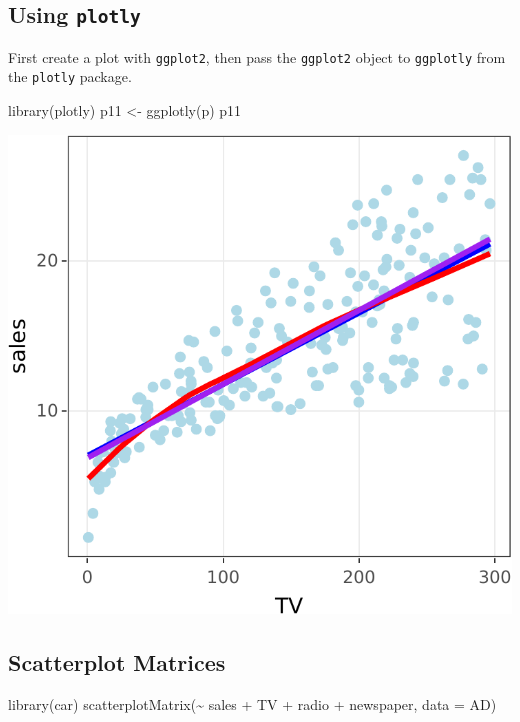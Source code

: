 \documentclass[
]{article}
\newenvironment{Shaded}{\begin{snugshade}}{\end{snugshade}}
\newcommand{\AttributeTok}[1]{\textcolor[rgb]{0.77,0.63,0.00}{#1}}
\newcommand{\FunctionTok}[1]{\textcolor[rgb]{0.00,0.00,0.00}{#1}}
\newcommand{\NormalTok}[1]{#1}
\newcommand{\OtherTok}[1]{\textcolor[rgb]{0.56,0.35,0.01}{#1}}
\newcommand{\SpecialCharTok}[1]{\textcolor[rgb]{0.00,0.00,0.00}{#1}}
\begin{document}
\hypertarget{using-plotly}{%
\subsection{\texorpdfstring{Using \texttt{plotly}}{Using plotly}}\label{using-plotly}}

First create a plot with \texttt{ggplot2}, then pass the \texttt{ggplot2} object to \texttt{ggplotly} from the \texttt{plotly} package.

\begin{Shaded}
\begin{Highlighting}[]
\FunctionTok{library}\NormalTok{(plotly)}
\NormalTok{p11 }\OtherTok{\textless{}{-}} \FunctionTok{ggplotly}\NormalTok{(p)}
\NormalTok{p11}
\end{Highlighting}
\end{Shaded}

\begin{center}\includegraphics{SDM-CHAP24_files/figure-latex/plotly-1} \end{center}

\hypertarget{scatterplot-matrices}{%
\subsection{Scatterplot Matrices}\label{scatterplot-matrices}}

\begin{Shaded}
\begin{Highlighting}[]
\FunctionTok{library}\NormalTok{(car)}
\FunctionTok{scatterplotMatrix}\NormalTok{(}\SpecialCharTok{\textasciitilde{}}\NormalTok{ sales }\SpecialCharTok{+}\NormalTok{ TV }\SpecialCharTok{+}\NormalTok{ radio }\SpecialCharTok{+}\NormalTok{ newspaper, }\AttributeTok{data =}\NormalTok{ AD)}
\end{Highlighting}
\end{Shaded}
\end{document}
